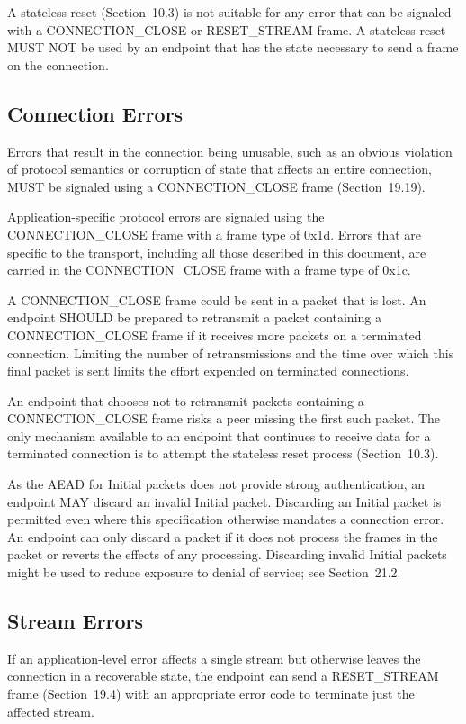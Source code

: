 \documentclass{article}
\begin{document}
A stateless reset (Section~10.3) is not suitable for any error that can be signaled with a CONNECTION\_CLOSE or RESET\_STREAM frame.  A stateless reset MUST NOT be used by an endpoint that has the state necessary to send a frame on the connection.

\subsection{Connection Errors}

Errors that result in the connection being unusable, such as an obvious violation of protocol semantics or corruption of state that affects an entire connection, MUST be signaled using a CONNECTION\_CLOSE frame (Section~19.19).

Application-specific protocol errors are signaled using the CONNECTION\_CLOSE frame with a frame type of 0x1d.  Errors that are specific to the transport, including all those described in this document, are carried in the CONNECTION\_CLOSE frame with a frame type of 0x1c.

A CONNECTION\_CLOSE frame could be sent in a packet that is lost.  An endpoint SHOULD be prepared to retransmit a packet containing a CONNECTION\_CLOSE frame if it receives more packets on a terminated connection.  Limiting the number of retransmissions and the time over which this final packet is sent limits the effort expended on terminated connections.

An endpoint that chooses not to retransmit packets containing a CONNECTION\_CLOSE frame risks a peer missing the first such packet. The only mechanism available to an endpoint that continues to receive data for a terminated connection is to attempt the stateless reset process (Section~10.3).

As the AEAD for Initial packets does not provide strong authentication, an endpoint MAY discard an invalid Initial packet. Discarding an Initial packet is permitted even where this specification otherwise mandates a connection error.  An endpoint can only discard a packet if it does not process the frames in the packet or reverts the effects of any processing.  Discarding invalid Initial packets might be used to reduce exposure to denial of service; see Section~21.2.

\subsection{Stream Errors}

If an application-level error affects a single stream but otherwise leaves the connection in a recoverable state, the endpoint can send a RESET\_STREAM frame (Section~19.4) with an appropriate error code to terminate just the affected stream.
\end{document}
